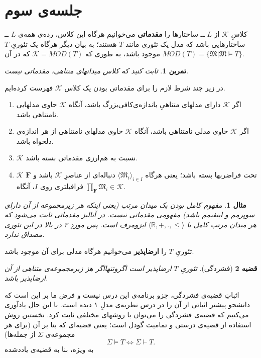 \documentclass[12pt,a4paper]{report}
\theoremstyle{colorhead}
\newtheorem{thm}{قضیه}
\newtheorem{tam}{تمرین}
\newtheorem{mesal}[thm]{مثال}
\begin{document}
\section{جلسه‌ی سوم}
کلاسِ
$\mathcal{K}$
از
$L$ ــ
ساختارها را 
\textbf{مقدماتی}
 می‌خوانیم هرگاه این کلاس، رده‌ی همه‌ی
$L$ ــ
ساختارهایی باشد که  مدل یک تئوری مانند
$T$
هستند؛ به بیان دیگر هرگاه یک تئوریِ 
$T$
موجود باشد، به طوری که
$\mathcal{K}=MOD(T)$
که 
در آن
$MOD(T)=\{\mathfrak{M}|\mathfrak{M}\models T\}$.
\begin{tam}
ثابت کنید که کلاس میدانهای متناهی، مقدماتی نیست.
\end{tam}
در زیر چند شرط لازم را برای مقدماتی بودن یک کلاس
$\mathcal{K}$
فهرست کرده‌ایم.
\begin{enumerate}
\item 
اگر
$\mathcal{K}$
دارای 
مدلهای متناهیِ‌ باندازه‌ی‌کافی‌بزرگ باشد، آنگاه
$\mathcal{K}$
حاوی مدلهایی نامتناهی باشد.
\item 
اگر
$\mathcal{K}$
حاوی 
مدلی نامتناهی باشد، آنگاه
$\mathcal{K}$
حاوی مدلهای نامتناهی از هر اندازه‌ی دلخواه باشد.
\item
$\mathcal{K}$
نسبت به هم‌ارزی مقدماتی بسته باشد.
\item 
$\mathcal{K}$
تحت فراضربها بسته باشد؛ یعنی هرگاه
$\langle \mathfrak{M}_i\rangle_{i\in I}$
دنباله‌ای از عناصرِ
$\mathcal{K}$
باشد و 
$\mathbf{F}$
فرافیلتری
روی
$I$،
آنگاه
$\prod_\mathbf{F}\mathfrak{M}_i\in \mathcal{K}$.
\end{enumerate}
\begin{mesal}
مفهوم کامل بودن یک میدان مرتب (یعنی اینکه هر زیرمجموعه‌ از آن دارای سوپرمم و اینفیمم باشد)‌ مفهومی مقدماتی نیست. در آنالیز مقدماتی ثابت می‌شود
که هر میدان مرتب کامل با
$\langle \mathbb{R},+,.,\leq\rangle$
ایزومرف است. پس موردِ ۲ در بالا 
در این تئوری مصداق ندارد.
\end{mesal}
تئوریِ
$T$
 را 
\textbf{ ارضاپذیر }
 می‌خوانیم هرگاه مدلی برای آن موجود باشد.
\begin{thm}[فشردگی]
تئوریِ
$T$
ارضاپذیر است اگروتنهااگر
هز زیرمجموعه‌ی متناهی از آن ارضاپذیر باشد. 
\end{thm}
اثباتِ قضیه‌ی فشردگی، جزو برنامه‌ی این درس نیست و فرض ما بر این است که دانشجو پیشتر اثباتی از آن را در درس نظریه‌ی مدلِ ۱ دیده است. با این حال یادآوری می‌کنیم
که قضیه‌ی فشردگی را می‌توان با روشهای مختلفی ثابت کرد. نخستین روش استفاده از قضیه‌ی درستی و تمامیت گودل است؛ یعنی قضیه‌ای که بنا بر آن (برای هر مجموعه‌ی
$\Sigma$
از جمله‌ها)
\[
\Sigma \models T \Leftrightarrow \Sigma\vdash T.
\]
به ویژه، بنا به قضیه‌ی یاددشده
\end{document}
